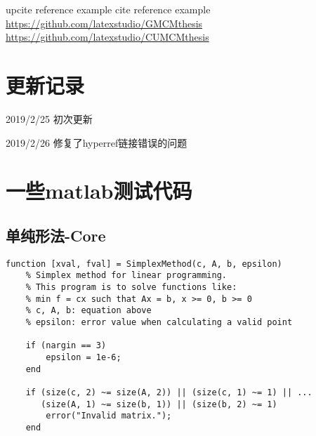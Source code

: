 \documentclass[bwprint, withouttitlepage]{mathexpthesis}
\begin{document}
\begin{thebibliography}{99}
     upcite reference example
     cite reference example
     \url{https://github.com/latexstudio/GMCMthesis}
     \url{https://github.com/latexstudio/CUMCMthesis}
\end{thebibliography}

\begin{appendices}
\section{更新记录}
2019/2/25 初次更新

2019/2/26 修复了hyperref链接错误的问题

\section{一些matlab测试代码}
\subsection{单纯形法-Core}
\begin{verbatim}
function [xval, fval] = SimplexMethod(c, A, b, epsilon)
    % Simplex method for linear programming.
    % This program is to solve functions like:
    % min f = cx such that Ax = b, x >= 0, b >= 0
    % c, A, b: equation above
    % epsilon: error value when calculating a valid point
    
    if (nargin == 3)
        epsilon = 1e-6;
    end

    if (size(c, 2) ~= size(A, 2)) || (size(c, 1) ~= 1) || ...
       (size(A, 1) ~= size(b, 1)) || (size(b, 2) ~= 1)
        error("Invalid matrix.");
    end


\end{verbatim}
\end{appendices}
\end{document}
